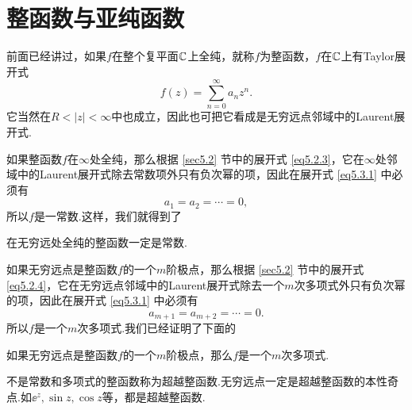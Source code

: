 \section{整函数与亚纯函数\label{sec5.3}}
前面已经讲过，如果$f$在整个复平面$\mathbb C$上全纯，就称$f$为整函数，$f$在$\mathbb C$上有Taylor展开式
\begin{equation}\label{eq5.3.1}
  f(z) = \sum_{n=0}^\infty a_nz^n.
\end{equation}
它当然在$R<|z|<\infty$中也成立，因此也可把它看成是无穷远点邻域中的Laurent展开式.

如果整函数$f$在$\infty$处全纯，那么根据 \ref{sec5.2} 节中的展开式 \eqref{eq5.2.3}，它在$\infty$处邻域中的Laurent展开式除去常数项外只有负次幂的项，因此在展开式 \eqref{eq5.3.1} 中必须有
\[
  a_1 = a_2 = \cdots = 0,
\]
所以$f$是一常数.这样，我们就得到了
\begin{theorem}\label{thm5.3.1}
  在无穷远处全纯的整函数一定是常数.
\end{theorem}

如果无穷远点是整函数$f$的一个$m$阶极点，那么根据 \ref{sec5.2} 节中的展开式 \eqref{eq5.2.4}，它在无穷远点邻域中的Laurent展开式除去一个$m$次多项式外只有负次幂的项，因此在展开式 \eqref{eq5.3.1} 中必须有
\[
  a_{m+1} = a_{m+2} = \cdots = 0.
\]
所以$f$是一个$m$次多项式.我们已经证明了下面的
\begin{theorem}\label{thm5.3.2}
  如果无穷远点是整函数$f$的一个$m$阶极点，那么$f$是一个$m$次多项式.
\end{theorem}

不是常数和多项式的整函数称为超越整函数.无穷远点一定是超越整函数的本性奇点.如$\ee^z,\sin z,\cos z$等，都是超越整函数.

